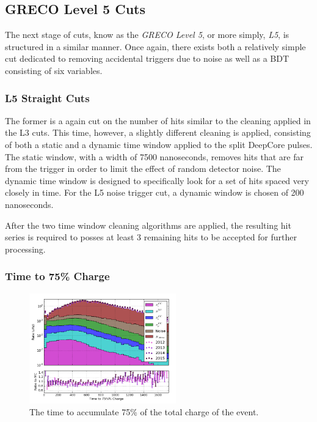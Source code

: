 \graphicspath{{chapters/greco/images/level5/}}

\subsection{GRECO Level 5 Cuts}
The next stage of cuts, know as the \emph{GRECO Level 5}, or more simply, \emph{L5}, is structured in a similar manner. 
Once again, there exists both a relatively simple cut dedicated to removing accidental triggers due to noise as well as a BDT consisting of six variables.

\subsubsection{L5 Straight Cuts}
The former is a again cut on the number of hits similar to the cleaning applied in the L3 cuts. 
This time, however, a slightly different cleaning is applied, consisting of both a static and a dynamic time window applied to the split DeepCore pulses.
The static window, with a width of 7500 nanoseconds, removes hits that are far from the trigger in order to limit the effect of random detector noise.
The dynamic time window is designed to specifically look for a set of hits spaced very closely in time.
For the L5 noise trigger cut, a dynamic window is chosen of 200 nanoseconds.

After the two time window cleaning algorithms are applied, the resulting hit series is required to posses at least 3 remaining hits to be accepted for further processing.

\subsubsection{Time to 75\% Charge}
\begin{figure}[h]
	\centering
		\includegraphics[width=2.5in]{Time_to_75_Charge_log.png}
		\caption[Time to 75\% Charge]{The time to accumulate 75\% of the total charge of the event.}
	\label{fig:time_to_75}
\end{figure}

